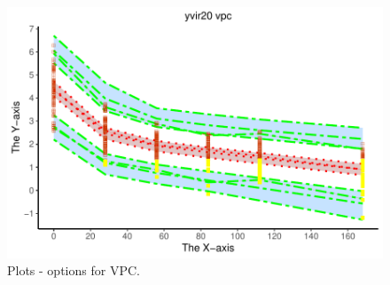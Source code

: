 \documentclass{report}
\begin{document}
\begin{figure}[H]
\caption{Plots - options for VPC.}
\centering
\includegraphics{BeautifulGraphs-Npde-v3-049}
\end{figure}
     
     
\end{document}
